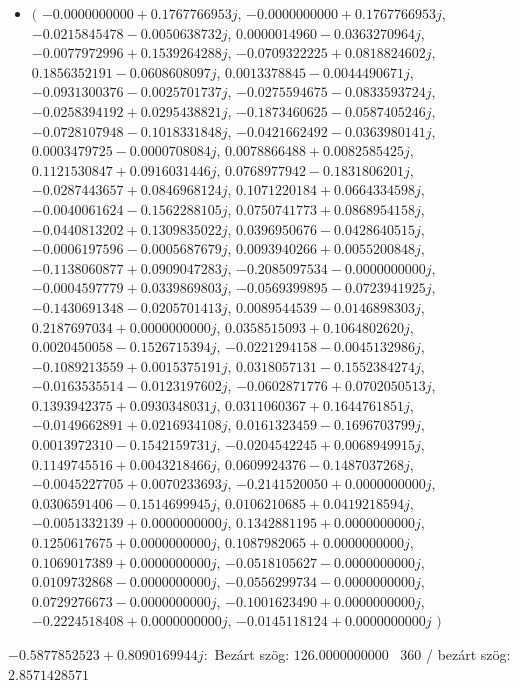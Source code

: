 \documentclass[14pt,a4paper]{article}
\begin{document}
\begin{itemize}
\item
$\big($
$-0.0000000000+0.1767766953j$, $-0.0000000000+0.1767766953j$, $-0.0215845478-0.0050638732j$, $0.0000014960-0.0363270964j$, $-0.0077972996+0.1539264288j$, $-0.0709322225+0.0818824602j$, $0.1856352191-0.0608608097j$, $0.0013378845-0.0044490671j$, $-0.0931300376-0.0025701737j$, $-0.0275594675-0.0833593724j$, $-0.0258394192+0.0295438821j$, $-0.1873460625-0.0587405246j$, $-0.0728107948-0.1018331848j$, $-0.0421662492-0.0363980141j$, $0.0003479725-0.0000708084j$, $0.0078866488+0.0082585425j$, $0.1121530847+0.0916031446j$, $0.0768977942-0.1831806201j$, $-0.0287443657+0.0846968124j$, $0.1071220184+0.0664334598j$, $-0.0040061624-0.1562288105j$, $0.0750741773+0.0868954158j$, $-0.0440813202+0.1309835022j$, $0.0396950676-0.0428640515j$, $-0.0006197596-0.0005687679j$, $0.0093940266+0.0055200848j$, $-0.1138060877+0.0909047283j$, $-0.2085097534-0.0000000000j$, $-0.0004597779+0.0339869803j$, $-0.0569399895-0.0723941925j$, $-0.1430691348-0.0205701413j$, $0.0089544539-0.0146898303j$, $0.2187697034+0.0000000000j$, $0.0358515093+0.1064802620j$, $0.0020450058-0.1526715394j$, $-0.0221294158-0.0045132986j$, $-0.1089213559+0.0015375191j$, $0.0318057131-0.1552384274j$, $-0.0163535514-0.0123197602j$, $-0.0602871776+0.0702050513j$, $0.1393942375+0.0930348031j$, $0.0311060367+0.1644761851j$, $-0.0149662891+0.0216934108j$, $0.0161323459-0.1696703799j$, $0.0013972310-0.1542159731j$, $-0.0204542245+0.0068949915j$, $0.1149745516+0.0043218466j$, $0.0609924376-0.1487037268j$, $-0.0045227705+0.0070233693j$, $-0.2141520050+0.0000000000j$, $0.0306591406-0.1514699945j$, $0.0106210685+0.0419218594j$, $-0.0051332139+0.0000000000j$, $0.1342881195+0.0000000000j$, $0.1250617675+0.0000000000j$, $0.1087982065+0.0000000000j$, $0.1069017389+0.0000000000j$, $-0.0518105627-0.0000000000j$, $0.0109732868-0.0000000000j$, $-0.0556299734-0.0000000000j$, $0.0729276673-0.0000000000j$, $-0.1001623490+0.0000000000j$, $-0.2224518408+0.0000000000j$, $-0.0145118124+0.0000000000j$
$\big)$
\end{itemize}
$-0.5877852523+0.8090169944j$:\
Bezárt szög: $126.0000000000$ \
360 / bezárt szög: $2.8571428571$\
\end{document}
